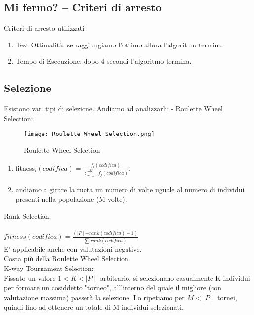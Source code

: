 \documentclass[10pt,a4paper]{article}
\begin{document}
      \newpage
      
    \subsection{Mi fermo? -- Criteri di arresto}
    \label{MiFermo?--CriteriDiArrestoSubsection}
    Criteri di arresto utilizzati:
    \begin{enumerate}
      \item Test Ottimalità: se raggiungiamo l’ottimo allora l'algoritmo termina.
      \item Tempo di Esecuzione: dopo 4 secondi l’algoritmo termina.
    \end{enumerate}
    
    \subsection{Selezione}
    \label{Selezione}
    Esistono vari tipi di selezione. Andiamo ad analizzarli:
    - Roulette Wheel Selection:
    \begin{figure}[h!]
      \centering
      \caption{Roulette Wheel Selection}
      \texttt{[image: Roulette Wheel Selection.png]}
      \label{RouletteWheelSelection}
    \end{figure}
    \begin{enumerate}
      \item fitness$_{i}(codifica) =\frac{f_{i}(codifica)}{\sum\limits_{j = 1}^{M} {f_{j} (codifica)}}$.
      \item andiamo a girare la ruota un numero di volte uguale al numero di individui presenti nella 
            popolazione (M volte).
    \end{enumerate} 
    
    \newpage
    
    Rank Selection:\\\\
    $ fitness(codifica) = \frac {(\mid P \mid - rank(codifica) + 1)} {\sum{rank(codifica)}}$\\
    E’ applicabile anche con valutazioni negative.\\
    Costa più della Roulette Wheel Selection.\\
    
    K-way Tournament Selection:\\
    Fissato un valore $1 < K < \mid P \mid$ arbitrario, si selezionano casualmente K individui per formare un 
    cosiddetto "torneo", all’interno del quale il migliore (con valutazione massima) passerà la 
    selezione. Lo ripetiamo per $M < \mid P \mid$ tornei, quindi fino ad ottenere un totale di M individui 
    selezionati.\\\\
    
\end{document}
